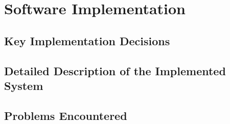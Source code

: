 \section{Software Implementation}




\subsection{Key Implementation Decisions}
\label{sec:kid}


\subsection{Detailed Description of the Implemented System}


\subsection{Problems Encountered}
